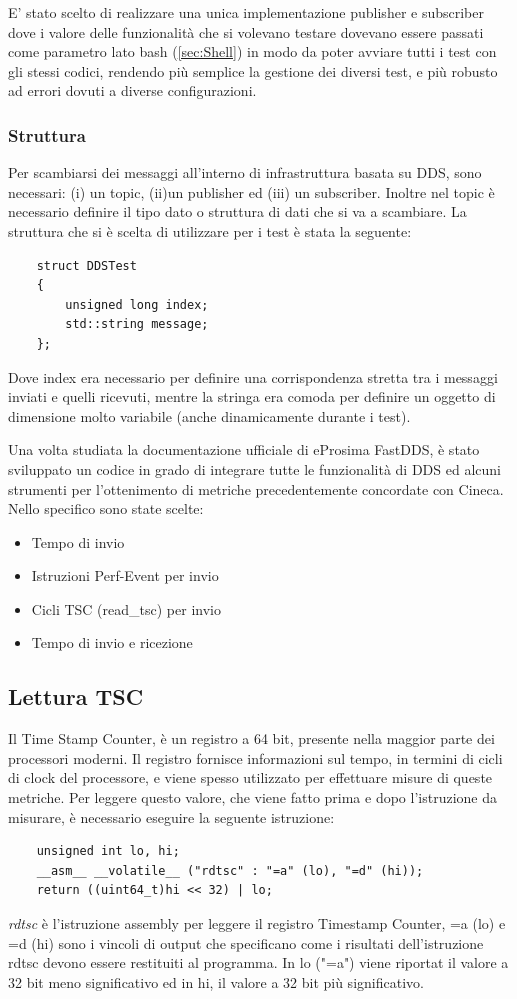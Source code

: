 E' stato scelto di realizzare una unica implementazione publisher e subscriber dove i valore delle funzionalità che si volevano testare dovevano essere passati come parametro lato bash (\ref{sec:Shell}) in modo da poter avviare tutti i test con gli stessi codici, rendendo più semplice la gestione dei diversi test, e più robusto ad errori dovuti a diverse configurazioni.
\subsubsection*{Struttura}

Per scambiarsi dei messaggi all'interno di infrastruttura basata su DDS, sono necessari: (i) un topic, (ii)un publisher ed (iii) un subscriber. Inoltre nel topic è necessario definire il tipo dato o struttura di dati che si va a scambiare. La struttura che si è scelta di utilizzare per i test è stata la seguente:
\begin{verbatim}
    struct DDSTest
    {
        unsigned long index;
        std::string message;
    };
\end{verbatim}
Dove index era necessario per definire una corrispondenza stretta tra i messaggi inviati e quelli ricevuti, mentre la stringa era comoda per definire un oggetto di dimensione molto variabile (anche dinamicamente durante i test).

Una volta studiata la documentazione ufficiale di eProsima FastDDS, è stato sviluppato un codice in grado di integrare tutte le funzionalità di DDS ed alcuni strumenti per l'ottenimento di metriche precedentemente concordate con Cineca\cite{Cineca}. Nello specifico sono state scelte:
\begin{itemize}
    \item Tempo di invio
    \item Istruzioni Perf-Event per invio
    \item Cicli TSC (read\_tsc) per invio
    \item Tempo di invio e ricezione
\end{itemize}
\subsection{Lettura TSC}
Il Time Stamp Counter, è un registro a 64 bit, presente nella maggior parte dei processori moderni. Il registro fornisce informazioni sul tempo, in termini di cicli di clock del processore, e viene spesso utilizzato per effettuare misure di queste metriche. Per leggere questo valore, che viene fatto prima e dopo l'istruzione da misurare, è necessario eseguire la seguente istruzione:
\begin{verbatim}
    unsigned int lo, hi;
    __asm__ __volatile__ ("rdtsc" : "=a" (lo), "=d" (hi));
    return ((uint64_t)hi << 32) | lo; 
\end{verbatim}
\emph{rdtsc} è l'istruzione \gls{assembly} per leggere il registro Timestamp Counter, =a (lo) e =d (hi) sono i vincoli di output che specificano come i risultati dell'istruzione rdtsc devono essere restituiti al programma. In lo ("=a") viene riportat il valore a 32 bit meno significativo ed in hi, il valore a 32 bit più significativo.

